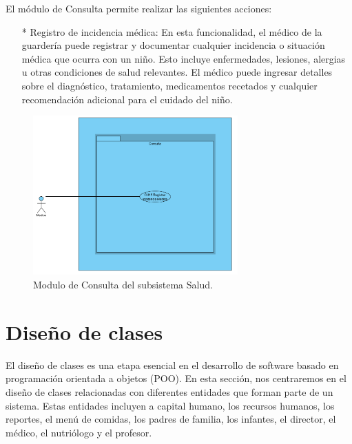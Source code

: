 El módulo de Consulta permite realizar las siguientes acciones:

\begin{itemize}
\item[*] Registro de incidencia médica: En esta funcionalidad, el médico de la guardería puede registrar y documentar cualquier incidencia o situación médica que ocurra con un niño. Esto incluye enfermedades, lesiones, alergias u otras condiciones de salud relevantes. El médico puede ingresar detalles sobre el diagnóstico, tratamiento, medicamentos recetados y cualquier recomendación adicional para el cuidado del niño.


\end{itemize}

\begin{figure}[htbp]
\centering
\includegraphics[width=0.7\textwidth]{images/arqui/subSaludConsulta.png}
\caption{Modulo de Consulta del subsistema Salud.}
\label{fig:subsistsaludcons}
\end{figure}
\clearpage


\section{Diseño de clases}

El diseño de clases es una etapa esencial en el desarrollo de software basado en programación orientada a objetos (POO). En esta sección, nos centraremos en el diseño de clases relacionadas con diferentes entidades que forman parte de un sistema. Estas entidades incluyen a capital humano, los recursos humanos, los reportes, el menú de comidas, los padres de familia, los infantes, el director, el médico, el nutriólogo y el profesor.\\

